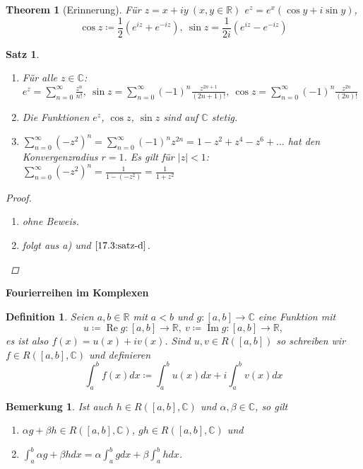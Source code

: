 \documentclass[12pt]{extreport} %
\newcommand{\C}{\mathbb{C}}
\newcommand{\R}{\mathbb{R}}
\theoremstyle{named}
\theoremstyle{nnamed}
\newtheorem*{unnamedtheorem*}{Theorem}
\theoremstyle{itshape}
\newtheorem{satz}[unnamedtheorem]{Satz}
\newtheorem*{definition}{Definition}
\theoremstyle{normal}
\newtheorem*{bemerkung}{Bemerkung}
\begin{document}
\begin{unnamedtheorem*}[Erinnerung]
	Für $z = x + iy ~(x, y \in \R)$ $e^{z} = e^{x} \left( \cos y + i \sin y \right)$,
		$$ \cos z \coloneqq \frac{1}{2} \left( e^{iz} + e^{-iz} \right), ~ \sin z = \frac{1}{2i} \left( e^{iz} - e^{-iz} \right) $$
\end{unnamedtheorem*}


\begin{satz} ~\ \label{17.4:satz}
	\begin{enumerate} 
		\item Für alle $z \in \C$: $e^{z} = \sum_{n=0}^{\infty} \frac{z^{n}}{n!}, ~ \sin z = \sum_{n=0}^{\infty} (-1)^{n} \frac{z^{2n+1}}{(2n+1)!}, ~ \cos z = \sum_{n=0}^{\infty} (-1)^{n} \frac{z^{2n}}{(2n)!}$
		\item Die Funktionen $e^{z}$, $\cos z$, $\sin z$ sind auf $\C$ stetig.
		\item $\sum_{n=0}^{\infty} \left( - z^{2} \right)^{n} = \sum_{n=0}^{\infty} (-1)^{n} z^{2n} = 1 - z^{2} + z^{4} - z^{6} + \dotsc$ hat den Konvergenzradius $r = 1$. Es gilt für $|z| < 1$: $\sum_{n=0}^{\infty} \left( -z^{2} \right)^{n} = \frac{1}{1 - \left(-z^{2}\right)} = \frac{1}{1 + z^{2}}$
	\end{enumerate}
	
	\begin{proof} ~\
		\begin{enumerate}
			\item ohne Beweis.
			\item folgt aus a) und $\ref{17.3:satz-d}$.
		\end{enumerate}
	\end{proof}
\end{satz}

\textbf{Fourierreihen im Komplexen}

\begin{definition}
	Seien $a, b \in \R$ mit $a < b$ und $g \colon [a, b] \rightarrow \C$ eine Funktion mit  
	$$ u \coloneqq \operatorname{Re} g : [a, b] \rightarrow \R, ~ v \coloneqq \operatorname{Im} g : [a, b] \rightarrow \R, $$
	es ist also $f(x) = u(x) + i v(x)$. Sind $u, v \in R\left([a, b]\right)$ so schreiben wir $f \in R\left([a, b], \C \right)$ und definieren
		$$ \int_{a}^{b} f(x) dx \coloneqq \int_{a}^{b} u(x) dx + i \int_{a}^{b} v(x) dx $$
\end{definition}


\begin{bemerkung}
	Ist auch $h \in R\left( [a, b], \C \right)$ und $\alpha, \beta \in \C$, so gilt
	\begin{enumerate}
		\item $\alpha g + \beta h \in R\left([a, b], \C\right)$, $g h \in R\left([a, b], \C \right)$ und
		\item $\int_{a}^{b} \alpha g + \beta h dx = \alpha \int_{a}^{b} g dx + \beta \int_{a}^{b} h dx$.
	\end{enumerate}	
\end{bemerkung}
\end{document}
